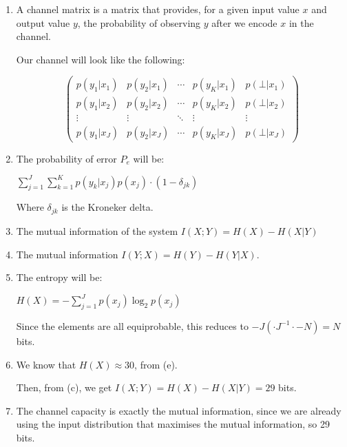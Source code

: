 



\begin{enumerate}[label=(\alph*)]
  \item

    A channel matrix is a matrix that provides, for a given input value $x$ and output value $y$, the probability of observing $y$ after we encode $x$ in the channel.


    Our channel will look like the following:

    \[
    \begin{pmatrix}
      p(y_1|x_1) &p(y_2|x_1) & \cdots & p(y_K|x_1) & p(\bot|x_1)\\
      p(y_1|x_2) & p(y_2|x_2) & \cdots & p(y_K|x_2) & p(\bot|x_2)\\
      \vdots & \vdots & \ddots & \vdots & \vdots\\
      p(y_1|x_J) & p(y_2|x_J) & \cdots & p(y_K|x_J) & p(\bot|x_J)
    \end{pmatrix}
    \] 

  \item

    The probability of error $P_e$ will be:

    $\sum_{j=1}^J\sum_{k=1}^K p(y_k|x_j)p(x_j)\cdot (1 - \delta_{jk})$

    Where $\delta_{jk}$ is the Kroneker delta.

  \item

    The mutual information of the system $I(X;Y) = H(X) - H(X|Y)$

  \item
    The mutual information $I(Y;X) = H(Y) - H(Y|X)$.

  \item
    The entropy will be:

    $H(X) = -\sum_{j=1}^J p(x_j)\log_2 p(x_j)$

    Since the elements are all equiprobable, this reduces to $-J (\cdot J^{-1} \cdot -N) = N$ bits.

  \item
    We know that $H(X) \approx 30$, from (e).

    Then, from (c), we get $I(X;Y) = H(X) - H(X|Y) = 29$ bits.

  \item
    The channel capacity is exactly the mutual information, since we are already using the input distribution that maximises the mutual information, so 29 bits.


        
\end{enumerate}

